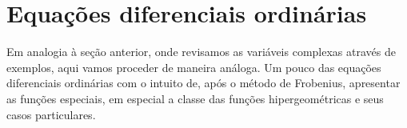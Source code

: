 
\chapter{Equações diferenciais ordinárias}

  Em analogia à seção anterior, onde revisamos as variáveis complexas através de exemplos, aqui vamos proceder de maneira análoga. Um pouco das equações diferenciais ordinárias com o intuito de, após o método de Frobenius, apresentar as funções especiais, em especial a classe das funções hipergeométricas e seus casos particulares.



